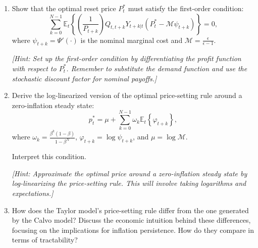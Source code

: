 \documentclass[dvipsnames,11pt]{article}
\begin{document}
    \begin{enumerate}
        \item Show that the optimal reset price \( P_t^* \) must satisfy the first-order condition:
        \[
        \sum_{k=0}^{N-1} \mathbb{E}_t \left\{ \left( \frac{1}{P_{t+k}} \right) Q_{t,t+k} Y_{t+k|t} \left( P_t^* - \mathcal{M} \psi_{t+k} \right) \right\} = 0,
        \]
        where \( \psi_{t+k} = \Psi'(\cdot) \) is the nominal marginal cost and \( \mathcal{M} = \frac{\epsilon}{\epsilon - 1} \).
    
        \textit{[Hint: Set up the first-order condition by differentiating the profit function with respect to \( P_t^* \). Remember to substitute the demand function and use the stochastic discount factor for nominal payoffs.]}
    
            \begin{solution}
    
                
                
            \end{solution}
    
        \item Derive the log-linearized version of the optimal price-setting rule around a zero-inflation steady state:
        \[
        p_t^* = \mu + \sum_{k=0}^{N-1} \omega_k \mathbb{E}_t \left\{ \varphi_{t+k} \right\},
        \]
        where \( \omega_k = \frac{\beta^k (1 - \beta)}{1 - \beta^N} \), \( \varphi_{t+k} = \log \psi_{t+k} \), and \( \mu = \log \mathcal{M} \).
    
        Interpret this condition.
    
        \textit{[Hint: Approximate the optimal price around a zero-inflation steady state by log-linearizing the price-setting rule. This will involve taking logarithms and expectations.]}
    
            \begin{solution}
    
                
                
            \end{solution}
    
        \item How does the Taylor model’s price-setting rule differ from the one generated by the Calvo model? Discuss the economic intuition behind these differences, focusing on the implications for inflation persistence. How do they compare in terms of tractability? 
    
            \begin{solution}
    

\end{solution}
\end{enumerate}
\end{document}
